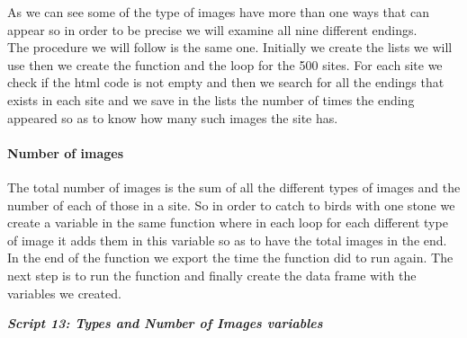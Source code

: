 \documentclass{article}
\begin{document}
As we can see some of the type of images have more than one ways that can appear so in order to be precise we will examine all nine different endings.\\
The procedure we will follow is the same one. Initially we create the lists we will use then we create the function and the loop for the 500 sites. For each site we check if the html code is not empty and then we search for all the endings that exists in each site and we save in the lists the number of times the ending appeared so as to know how many such images the site has.
\paragraph{Number of images}
The total number of images is the sum of all the different types of images and the number of each of those in a site. So in order to catch to birds with one stone we create a variable in the same function where in each loop for each different type of image it adds them in this variable so as to have the total images in the end.\\
In the end of the function we export the time the function did to run again. The next step is to run the function and finally create the data frame with the variables we created.
\begin{center}
\textit{\textbf{Script 13: Types and Number of Images variables}}
\end{center}
\end{document}
